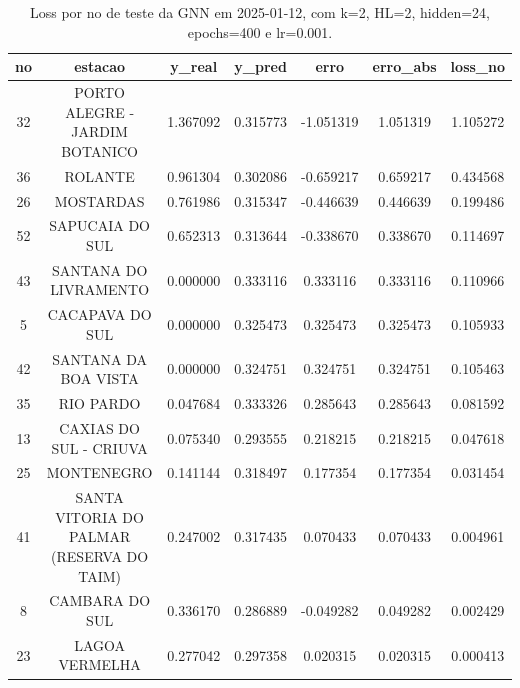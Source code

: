 \begin{table}[h]
\centering
\caption{Loss por no de teste da GNN em 2025-01-12, com k=2, HL=2, hidden=24, epochs=400 e lr=0.001.}
\label{tab:gnn_loss_k2_hl2_h24_e400_d20250112}
\begin{tabular}{ccccccc}
\toprule
no & estacao & y\_real & y\_pred & erro & erro\_abs & loss\_no \\
\midrule
32 & PORTO ALEGRE - JARDIM BOTANICO & 1.367092 & 0.315773 & -1.051319 & 1.051319 & 1.105272 \\
36 & ROLANTE & 0.961304 & 0.302086 & -0.659217 & 0.659217 & 0.434568 \\
26 & MOSTARDAS & 0.761986 & 0.315347 & -0.446639 & 0.446639 & 0.199486 \\
52 & SAPUCAIA DO SUL & 0.652313 & 0.313644 & -0.338670 & 0.338670 & 0.114697 \\
43 & SANTANA DO LIVRAMENTO & 0.000000 & 0.333116 & 0.333116 & 0.333116 & 0.110966 \\
5 & CACAPAVA DO SUL & 0.000000 & 0.325473 & 0.325473 & 0.325473 & 0.105933 \\
42 & SANTANA DA BOA VISTA & 0.000000 & 0.324751 & 0.324751 & 0.324751 & 0.105463 \\
35 & RIO PARDO & 0.047684 & 0.333326 & 0.285643 & 0.285643 & 0.081592 \\
13 & CAXIAS DO SUL - CRIUVA & 0.075340 & 0.293555 & 0.218215 & 0.218215 & 0.047618 \\
25 & MONTENEGRO & 0.141144 & 0.318497 & 0.177354 & 0.177354 & 0.031454 \\
41 & SANTA VITORIA DO PALMAR (RESERVA DO TAIM) & 0.247002 & 0.317435 & 0.070433 & 0.070433 & 0.004961 \\
8 & CAMBARA DO SUL & 0.336170 & 0.286889 & -0.049282 & 0.049282 & 0.002429 \\
23 & LAGOA VERMELHA & 0.277042 & 0.297358 & 0.020315 & 0.020315 & 0.000413 \\
\bottomrule
\end{tabular}
\end{table}
